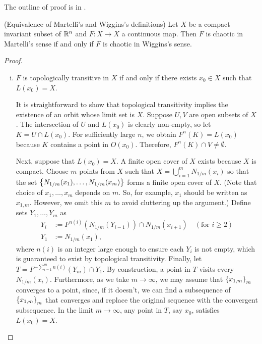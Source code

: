 \documentclass[12pt,draft,twoside]{book}
\begin{document}
The outline of proof is in \citet{martelli98}.
\begin{theorem}
  (Equivalence of Martelli's and Wiggins's definitions)
  Let $X$ be a compact invariant subset of $\mathbb{R}^n$ and $F: X\to X$ a continuous map.
  Then $F$ is chaotic in Martelli's sense if and only if $F$ is chaotic in Wiggins's sense.
  \label{thm:martelliwigginsequiv}

\begin{proof}
   \begin{enumerate}[(i)]
    \item $F$ is topologically transitive in $X$ if and only if there exists $x_0 \in X$ such that $L(x_0) = X$.

    It is straightforward to show that topological transitivity implies the existence of an orbit whose limit set is $X$.
    Suppose $U,V$ are open subsets of $X$.
    The intersection of $U$ and $L(x_0)$ is clearly non-empty, so let $K = U \cap L(x_0)$.
    For sufficiently large $n$, we obtain $F^n(K) = L(x_0)$ because $K$ contains a point in $O(x_0)$.
    Therefore, $F^n(K) \cap V \neq \emptyset$.

    Next, suppose that $L(x_0) = X$.
    A finite open cover of $X$ exists because $X$ is compact.
    Choose $m$ points from $X$ such that $X = \bigcup\limits_{i=1}^m N_{1/m}(x_i)$
    so that the set $\left \{ N_{1/m}(x_1), \ldots, N_{1/m}(x_m) \right \}$ forms a finite open cover of $X$.
    (Note that choice of $x_1, \ldots, x_m$ depends on $m$.
    So, for example, $x_1$ should be written as $x_{1,m}$.
    However, we omit this $m$ to avoid cluttering up the argument.)
    Define sets $Y_1, \ldots, Y_m$ as
    \begin{align*}
      Y_i &:= F^{n(i)}(N_{1/m}(Y_{i-1})) \cap N_{1/m}(x_{i+1}) \quad (\mbox{for } i \geq 2) \\
      Y_1 &:= N_{1/m}(x_1),
    \end{align*}
    where $n(i)$ is an integer large enough to ensure each $Y_i$ is not empty, which is guaranteed to exist by topological transitivity.
    Finally, let $T = F^{-\sum\limits_{i=1}^{m}n(i)}(Y_m) \cap Y_1$.
    By construction, a point in $T$ visits every $N_{1/m}(x_i)$.
    Furthermore, as we take $m \to \infty$, we may assume that $\left \{ x_{1,m} \right \}_m$ converges to a point, 
    since, if it doesn't, we can find a subsequence of $\left \{ x_{1,m} \right \}_m$ that converges and replace the original sequence with the convergent subsequence.
    In the limit $m \to \infty$, any point in $T$, say $x_0$, satisfies $L(x_0) = X$.


\end{enumerate}
\end{proof}
\end{theorem}
\end{document}
